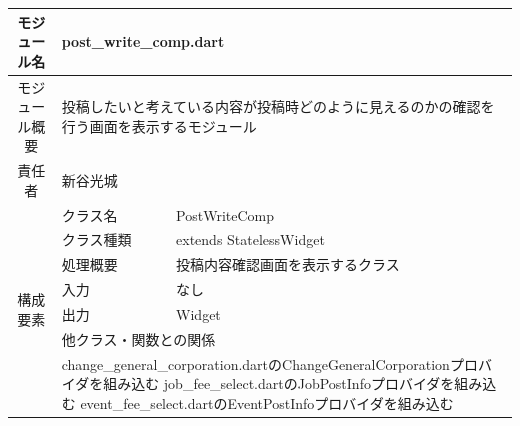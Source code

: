 \begin{table}[H]
  \centering
  \begin{tabular}{|c|l|l|} \hline
    モジュール名                & \multicolumn{2}{l|}{post\_write\_comp.dart}                                                                                                \\ \hline
    モジュール概要               & \multicolumn{2}{p{12cm}|}{投稿したいと考えている内容が投稿時どのように見えるのかの確認を行う画面を表示するモジュール}                                                                    \\ \hline
    責任者                   & \multicolumn{2}{l|}{新谷光城}                                                                                                                  \\ \hline
    \multirow{7}{*}{構成要素} & クラス名                                                                                         & PostWriteComp                               \\ \cline{2-3}
                          & クラス種類                                                                                        & extends StatelessWidget                     \\ \cline{2-3}
                          & 処理概要                                                                                         & \multicolumn{1}{p{12cm}|}{投稿内容確認画面を表示するクラス} \\ \cline{2-3}
                          & 入力                                                                                           & なし                                          \\ \cline{2-3}
                          & 出力                                                                                           & Widget                                      \\ \cline{2-3}
                          & \multicolumn{2}{l|}{他クラス・関数との関係}                                                                                                           \\ \cline{2-3}
                          & \multicolumn{2}{p{14cm}|}{change\_general\_corporation.dartのChangeGeneralCorporationプロバイダを組み込む
      \newline job\_fee\_select.dartのJobPostInfoプロバイダを組み込む
      \newline event\_fee\_select.dartのEventPostInfoプロバイダを組み込む
}
\end{tabular}
\end{table}
